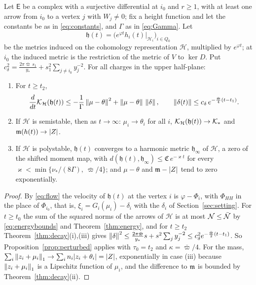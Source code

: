 \begin{theorem}\label{thm:convergence}
Let $\mathsf E$ be a complex with a surjective differential at $i_0$ and
$r\geq1$, with at least one arrow from $i_0$ to a vertex $j$ with
$W_j\neq0$; fix a height function and let the constants be as in
\eqref{eq:constants}, and $\Gamma$ as in \eqref{eq:Gamma}. Let
\[
 \mathfrak h(t)=\bigl(e^{\varphi t}h_i(t)|_{\mathcal H_i}\bigr)_{i\in Q_0}
\]
be the metrics induced on the cohomology representation $\mathcal H$,
multiplied by $e^{\varphi t}$; at $i_0$ the induced metric is the restriction
of the metric of $V$ to $\ker D$. Put
$c_\delta^2=\frac{2\pi\bar\varpi\,s_1}{y_\ast}+s_1^2\sum_{j\neq i_0}y_j^{-2}$.
For all charges in the upper half-plane:
\begin{enumerate}
\item[(i)] For $t\geq t_2$,
 \[
 \frac d{dt}\mathcal K_{\mathcal H}(\mathfrak h(t))\leq-\frac1\Gamma\left\lVert\mu-\theta\right\rVert^2+\left\lVert\mu-\theta\right\rVert\,\left\lVert\delta\right\rVert,
 \qquad\left\lVert\delta(t)\right\rVert\leq c_\delta\,e^{-\frac{\bar\varpi}4(t-t_1)}.
 \]
\item[(ii)] If $\mathcal H$ is semistable, then as $t\to\infty$:
 $\mu_i\to\theta_i$ for all $i$, $\mathcal K_{\mathcal H}(\mathfrak h(t))\to\mathcal K_*$
 and $\mathfrak m(h(t))\to|Z|$.
\item[(iii)] If $\mathcal H$ is polystable, $\mathfrak h(t)$ converges to a
 harmonic metric $\mathfrak h_\infty$ of $\mathcal H$, a zero of the shifted
 moment map, with
 $d(\mathfrak h(t),\mathfrak h_\infty)\leq\mathfrak C\,e^{-\varkappa t}$ for
 every $\varkappa<\min\{\nu_*/(8\Gamma),\ \bar\varpi/4\}$; and $\mu-\theta$ and
 $\mathfrak m-|Z|$ tend to zero exponentially.
\end{enumerate}
\end{theorem}

\begin{proof}
By \eqref{eq:flow} the velocity of $\mathfrak h(t)$ at the vertex $i$ is
$\varphi-\Phi_i$, with $\Phi_{HH}$ in the place of $\Phi_{i_0}$, that is,
$\xi_i=G_i(\mu_i)-\delta_i$ with the $\delta_i$ of
Section~\ref{sec:setting}. For $t\geq t_0$ the sum of the squared norms of
the arrows of $\mathcal H$ is at most $\mathcal N\leq\bar{\mathcal N}$ by
\eqref{eq:energybounds} and Theorem~\ref{thm:energy}, and for $t\geq t_2$
Theorem~\ref{thm:decay}(i),(iii) gives
$\left\lVert\delta\right\rVert^2\leq\frac{2\pi\bar\varpi}{y_\ast}s+s^2\sum_jy_j^{-2}\leq c_\delta^2e^{-\frac{\bar\varpi}2(t-t_1)}$.
So Proposition~\ref{prop:perturbed} applies with $\tau_0=t_2$ and
$\kappa=\bar\varpi/4$. For the mass,
$\sum_i\left\lVert z_i+\mu_i\right\rVert_1\to\sum_in_i|z_i+\theta_i|=|Z|$, exponentially in
case (iii) because $\left\lVert z_i+\mu_i\right\rVert_1$ is a Lipschitz function of $\mu_i$,
and the difference to $\mathfrak m$ is bounded by Theorem~\ref{thm:decay}(ii).
\end{proof}

